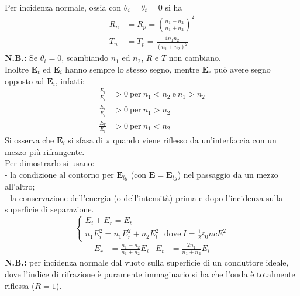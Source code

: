 \documentclass{article}
\begin{document}
\\
Per incidenza normale, ossia con $\theta_i=\theta_t=0$ si ha 
\begin{equation}
\begin{split}
    R_n &=R_p=\left(\frac{n_1-n_2}{n_1+n_2} \right)^2 \\
    T_n &=T_p=\frac{4n_1n_2}{(n_1+n_2)^2}
    \nonumber
\end{split}
\end{equation}
\textbf{N.B.:} Se $\theta_i=0$, scambiando $n_1$ ed $n_2$, $R$ e $T$ non cambiano.\\
Inoltre $\textbf{E}_t$ ed $\textbf{E}_i$ hanno sempre lo stesso segno, mentre $\textbf{E}_r$ può avere segno opposto ad $\textbf{E}_i$, infatti:
\begin{equation}
\begin{split}
    \frac{E_t}{E_i}&>0\ \text{per}\ n_1<n_2\ \text{e}\ n_1>n_2 \\
    \frac{E_r}{E_i}&>0\ \text{per}\ n_1>n_2 \\
    \frac{E_r}{E_i}&>0\ \text{per}\ n_1<n_2
    \nonumber
\end{split}
\end{equation}
Si osserva che $\textbf{E}_i$ si sfasa di $\pi$ quando viene riflesso da un’interfaccia con un mezzo più rifrangente.\\
Per dimostrarlo si usano:\\
- la condizione al contorno per $\textbf{E}_{tg}$ (con $\textbf{E}=\textbf{E}_{tg}$) nel passaggio da un mezzo all’altro;\\
- la conservazione dell’energia (o dell’intensità) prima e dopo l’incidenza sulla superficie di separazione.\\
\begin{equation}
\begin{cases}
    E_i + E_r = E_t \\
    n_1E_i^2=n_1E_r^2+n_2E_t^2\ \ \  \text{dove}\ I=\frac{1}{2}\varepsilon_0ncE^2
    \nonumber
\end{cases}
\end{equation}
\begin{align*}
    E_r &=\frac{n_1-n_2}{n_1+n_2}E_i & E_t &=\frac{2n_1}{n_1+n_2}E_i
    \nonumber
\end{align*}
\textbf{N.B.:} per incidenza normale dal vuoto sulla superficie di un conduttore ideale, dove l’indice di rifrazione è puramente immaginario si ha che l’onda è totalmente riflessa ($R=1$).
\end{document}
